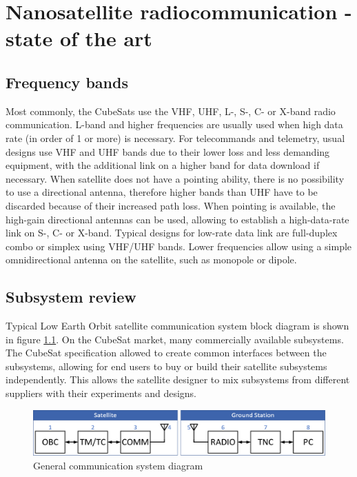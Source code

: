 \chapter{Nanosatellite radiocommunication - state of the art}

\section{Frequency bands}
Most commonly, the CubeSats use the VHF, UHF, L-, S-, C- or X-band radio communication. L-band and higher frequencies are usually used when high data rate (in order of \SI{1}{\Mbps} or more) is necessary. For telecommands and telemetry, usual designs use VHF and UHF bands due to their lower loss and less demanding equipment, with the additional link on a higher band for data download if necessary. When satellite does not have a pointing ability, there is no possibility to use a directional antenna, therefore higher bands than UHF have to be discarded because of their increased path loss. When pointing is available, the high-gain directional antennas can be used, allowing to establish a high-data-rate link on S-, C- or X-band. Typical designs for low-rate data link are full-duplex combo or simplex using VHF/UHF bands. Lower frequencies allow using a simple omnidirectional antenna on the satellite, such as monopole or dipole.

\section{Subsystem review}
Typical Low Earth Orbit satellite communication system block diagram is shown in figure \ref{comm_diagram}.
On the CubeSat market, many commercially available subsystems. The CubeSat specification allowed to create common interfaces between the subsystems, allowing for end users to buy or build their satellite subsystems independently. This allows the satellite designer to mix subsystems from different suppliers with their experiments and designs.

\begin{figure}[h]
    \centering
    \includegraphics[width=0.7\paperwidth]{img/4/comm_diagram.eps}
    \caption{General communication system diagram}
    \label{comm_diagram}
\end{figure}

